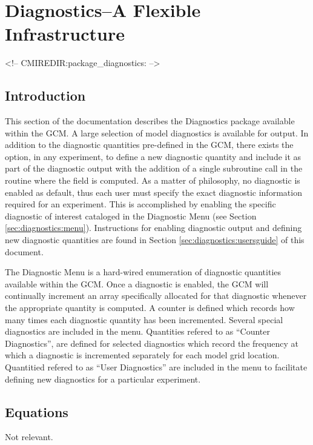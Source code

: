 \section{Diagnostics--A Flexible Infrastructure}
\label{sec:pkg:diagnostics}
\begin{rawhtml}
<!-- CMIREDIR:package_diagnostics: -->
\end{rawhtml}

\subsection{Introduction}

\noindent
This section of the documentation describes the Diagnostics package available within 
the GCM.  A large selection of model diagnostics is available for output.  
In addition to the diagnostic quantities pre-defined in the GCM, there exists
the option, in any experiment, to define a new diagnostic quantity and include it
as part of the diagnostic output with the addition of a single subroutine call in the
routine where the field is computed. As a matter of philosophy, no diagnostic is enabled 
as default, thus each user must specify the exact diagnostic information required for an 
experiment.  This is accomplished by enabling the specific diagnostic of interest cataloged 
in the Diagnostic Menu (see Section \ref{sec:diagnostics:menu}). Instructions for enabling
diagnostic output and defining new diagnostic quantities are found in Section 
\ref{sec:diagnostics:usersguide} of this document.

\noindent
The Diagnostic Menu is a hard-wired enumeration of diagnostic quantities available within 
the GCM. Once a diagnostic is enabled, the GCM will continually increment an array
specifically allocated for that diagnostic whenever the appropriate quantity is computed.  
A counter is defined which records how many times each diagnostic quantity has been 
incremented.  Several special diagnostics are included in the menu. Quantities refered to 
as ``Counter Diagnostics'', are defined for selected diagnostics which record the 
frequency at which a diagnostic is incremented separately for each model grid location.
Quantitied refered to as ``User Diagnostics'' are included in the menu to facilitate
defining new diagnostics for a particular experiment.

\subsection{Equations}
Not relevant.

